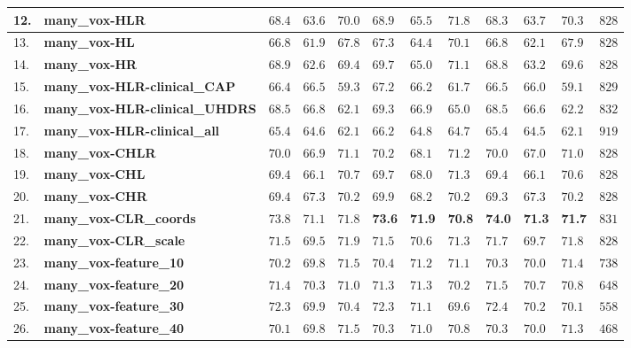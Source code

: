 {\begin{longtable}[H]{|p{0.6cm}|p{10.3cm}|p{1.1cm}|p{1.1cm}|p{1.1cm}|p{1.1cm}|p{1.1cm}|p{1.1cm}|p{1.1cm}|p{1.1cm}|p{1.1cm}|r|}
12. & \textbf{many\_vox-HLR} & $68.4$ & $63.6$ & $70.0$ & $68.9$ & $65.5$ & $71.8$ & $68.3$ & $63.7$ & $70.3$ & $828$ \\ \hline
13. & \textbf{many\_vox-HL} & $66.8$ & $61.9$ & $67.8$ & $67.3$ & $64.4$ & $70.1$ & $66.8$ & $62.1$ & $67.9$ & $828$ \\ \hline
14. & \textbf{many\_vox-HR} & $68.9$ & $62.6$ & $69.4$ & $69.7$ & $65.0$ & $71.1$ & $68.8$ & $63.2$ & $69.6$ & $828$ \\ \hline
15. & \textbf{many\_vox-HLR-clinical\_CAP} & $66.4$ & $66.5$ & $59.3$ & $67.2$ & $66.2$ & $61.7$ & $66.5$ & $66.0$ & $59.1$ & $829$ \\ \hline
16. & \textbf{many\_vox-HLR-clinical\_UHDRS} & $68.5$ & $66.8$ & $62.1$ & $69.3$ & $66.9$ & $65.0$ & $68.5$ & $66.6$ & $62.2$ & $832$ \\ \hline
17. & \textbf{many\_vox-HLR-clinical\_all} & $65.4$ & $64.6$ & $62.1$ & $66.2$ & $64.8$ & $64.7$ & $65.4$ & $64.5$ & $62.1$ & $919$ \\ \hline
18. & \textbf{many\_vox-CHLR} & $70.0$ & $66.9$ & $71.1$ & $70.2$ & $68.1$ & $71.2$ & $70.0$ & $67.0$ & $71.0$ & $828$ \\ \hline
19. & \textbf{many\_vox-CHL} & $69.4$ & $66.1$ & $70.7$ & $69.7$ & $68.0$ & $71.3$ & $69.4$ & $66.1$ & $70.6$ & $828$ \\ \hline
20. & \textbf{many\_vox-CHR} & $69.4$ & $67.3$ & $70.2$ & $69.9$ & $68.2$ & $70.2$ & $69.3$ & $67.3$ & $70.2$ & $828$ \\ \hline
21. & \textbf{many\_vox-CLR\_coords} & $73.8$ & $71.1$ & $71.8$ & \textbf{73.6} & \textbf{71.9} & \textbf{70.8} & \textbf{74.0} & \textbf{71.3} & \textbf{71.7} & $831$ \\ \hline
22. & \textbf{many\_vox-CLR\_scale} & $71.5$ & $69.5$ & $71.9$ & $71.5$ & $70.6$ & $71.3$ & $71.7$ & $69.7$ & $71.8$ & $828$ \\ \hline
23. & \textbf{many\_vox-feature\_10} & $70.2$ & $69.8$ & $71.5$ & $70.4$ & $71.2$ & $71.1$ & $70.3$ & $70.0$ & $71.4$ & $738$ \\ \hline
24. & \textbf{many\_vox-feature\_20} & $71.4$ & $70.3$ & $71.0$ & $71.3$ & $71.3$ & $70.2$ & $71.5$ & $70.7$ & $70.8$ & $648$ \\ \hline
25. & \textbf{many\_vox-feature\_30} & $72.3$ & $69.9$ & $70.4$ & $72.3$ & $71.1$ & $69.6$ & $72.4$ & $70.2$ & $70.1$ & $558$ \\ \hline
26. & \textbf{many\_vox-feature\_40} & $70.1$ & $69.8$ & $71.5$ & $70.3$ & $71.0$ & $70.8$ & $70.3$ & $70.0$ & $71.3$ & $468$ \\ \hline

\end{longtable}}
